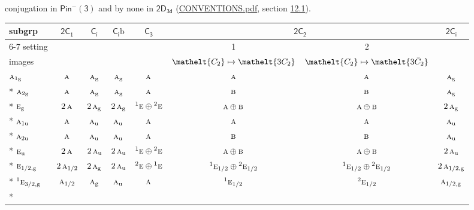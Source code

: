 \documentclass[10pt,a4paper]{article}
\numberwithin{equation}{section}
\newcommand{\eltfont}[1]{{\let\sigma\eltsigma\mathelt{#1}}}
\newcommand{\grp}[1]{\mathsf{#1}}
\newcommand{\irr}[1]{\text{\normalfont\scshape #1}}
\newcommand{\conjpair}[1]{{}^{#1}}
\newcommand{\cls}[1]{\eltfont{#1}}
\newcommand{\ptag}[1]{\mathrm{#1}}
\newcommand{\barred}[1]{\bar{#1}}
\newcommand{\secondclass}{\mathrm{b}}
\begin{document}
conjugation in \href{Pinminus3.pdf}{$\grp{Pin^{-}(3)}$} and by none in $\grp{2D_{3d}}$ (\href{../../CONVENTIONS.pdf}{CONVENTIONS.pdf}, section \href{../../../rotation/CONVENTIONS.pdf\#conv.12.1}{12.1}).
{\small\begin{longtable}{@{}lccccccc@{}}\toprule
subgrp & \href{2C1.pdf}{$\grp{2C_{1}}$} & \href{S2.pdf}{$\grp{C_{i}}$} & \href{S2b.pdf}{$\grp{C_{i}}\secondclass$} & \href{C3.pdf}{$\grp{C_{3}}$} & \multicolumn{2}{c}{\href{2C2.pdf}{$\grp{2C_{2}}$}} & \href{2S2.pdf}{$\grp{2C_{i}}$}\\\cmidrule(lr){6-7}
setting &  &  &  &  & 1 & 2 & \\
images &  &  &  &  & {\scriptsize $\cls{C_{2}} \mapsto \cls{3C_{2}}$} & {\scriptsize $\cls{C_{2}} \mapsto \cls{3\barred{C}_{2}}$} & \\\midrule\endhead
\bottomrule\endfoot\endlastfoot
$\irr{a}_{1\ptag{g}}$ & $\irr{a}$ & $\irr{a}_{\ptag{g}}$ & $\irr{a}_{\ptag{g}}$ & $\irr{a}$ & $\irr{a}$ & $\irr{a}$ & $\irr{a}_{\ptag{g}}$\\*
$\irr{a}_{2\ptag{g}}$ & $\irr{a}$ & $\irr{a}_{\ptag{g}}$ & $\irr{a}_{\ptag{g}}$ & $\irr{a}$ & $\irr{b}$ & $\irr{b}$ & $\irr{a}_{\ptag{g}}$\\*
$\irr{e}_{\ptag{g}}$ & $2\,\irr{a}$ & $2\,\irr{a}_{\ptag{g}}$ & $2\,\irr{a}_{\ptag{g}}$ & $\conjpair{1}\irr{e}\oplus \conjpair{2}\irr{e}$ & $\irr{a}\oplus \irr{b}$ & $\irr{a}\oplus \irr{b}$ & $2\,\irr{a}_{\ptag{g}}$\\*
$\irr{a}_{1\ptag{u}}$ & $\irr{a}$ & $\irr{a}_{\ptag{u}}$ & $\irr{a}_{\ptag{u}}$ & $\irr{a}$ & $\irr{a}$ & $\irr{a}$ & $\irr{a}_{\ptag{u}}$\\*
$\irr{a}_{2\ptag{u}}$ & $\irr{a}$ & $\irr{a}_{\ptag{u}}$ & $\irr{a}_{\ptag{u}}$ & $\irr{a}$ & $\irr{b}$ & $\irr{b}$ & $\irr{a}_{\ptag{u}}$\\*
$\irr{e}_{\ptag{u}}$ & $2\,\irr{a}$ & $2\,\irr{a}_{\ptag{u}}$ & $2\,\irr{a}_{\ptag{u}}$ & $\conjpair{1}\irr{e}\oplus \conjpair{2}\irr{e}$ & $\irr{a}\oplus \irr{b}$ & $\irr{a}\oplus \irr{b}$ & $2\,\irr{a}_{\ptag{u}}$\\*
$\irr{e}_{1/2,\ptag{g}}$ & $2\,\irr{a}_{1/2}$ & $2\,\irr{a}_{\ptag{g}}$ & $2\,\irr{a}_{\ptag{u}}$ & $\conjpair{2}\irr{e}\oplus \conjpair{1}\irr{e}$ & $\conjpair{1}\irr{e}_{1/2}\oplus \conjpair{2}\irr{e}_{1/2}$ & $\conjpair{1}\irr{e}_{1/2}\oplus \conjpair{2}\irr{e}_{1/2}$ & $2\,\irr{a}_{1/2,\ptag{g}}$\\*
$\conjpair{1}\irr{e}_{3/2,\ptag{g}}$ & $\irr{a}_{1/2}$ & $\irr{a}_{\ptag{g}}$ & $\irr{a}_{\ptag{u}}$ & $\irr{a}$ & $\conjpair{1}\irr{e}_{1/2}$ & $\conjpair{2}\irr{e}_{1/2}$ & $\irr{a}_{1/2,\ptag{g}}$\\*

\end{longtable}}
\end{document}
